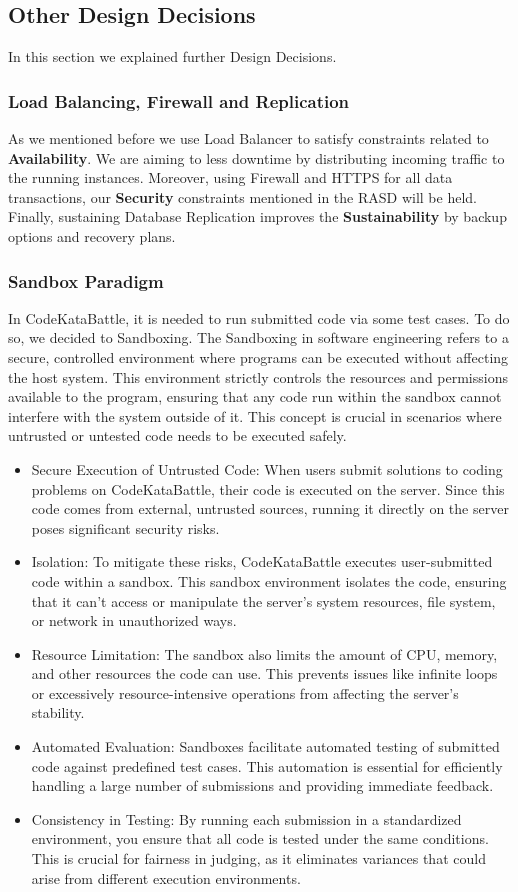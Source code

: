 \subsection{Other Design Decisions}
In this section we explained further Design Decisions.
\subsubsection{Load Balancing, Firewall and Replication}
As we mentioned before we use Load Balancer to satisfy constraints related to \textbf{Availability}. We are aiming to less downtime by distributing incoming traffic to the running instances. Moreover, using Firewall and HTTPS for all data transactions, our \textbf{Security} constraints mentioned in the RASD will be held. Finally, sustaining Database Replication improves the \textbf{Sustainability}
by backup options and recovery plans. 

\subsubsection{Sandbox Paradigm}
In CodeKataBattle, it is needed to run submitted code via some test cases. To do so, we decided to Sandboxing. The Sandboxing in software engineering refers to a secure, controlled environment where programs can be executed without affecting the host system. This environment strictly controls the resources and permissions available to the program, ensuring that any code run within the sandbox cannot interfere with the system outside of it. This concept is crucial in scenarios where untrusted or untested code needs to be executed safely.
\begin{itemize}
\item Secure Execution of Untrusted Code: When users submit solutions to coding problems on CodeKataBattle, their code is executed on the server. Since this code comes from external, untrusted sources, running it directly on the server poses significant security risks.
\item Isolation: To mitigate these risks, CodeKataBattle executes user-submitted code within a sandbox. This sandbox environment isolates the code, ensuring that it can't access or manipulate the server's system resources, file system, or network in unauthorized ways.
\item Resource Limitation: The sandbox also limits the amount of CPU, memory, and other resources the code can use. This prevents issues like infinite loops or excessively resource-intensive operations from affecting the server's stability.
\item Automated Evaluation: Sandboxes facilitate automated testing of submitted code against predefined test cases. This automation is essential for efficiently handling a large number of submissions and providing immediate feedback.
\item Consistency in Testing: By running each submission in a standardized environment, you ensure that all code is tested under the same conditions. This is crucial for fairness in judging, as it eliminates variances that could arise from different execution environments.
\end{itemize}

